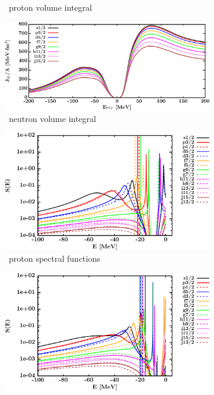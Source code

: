 \begin{figure}[hbtp]
\begin{subfigure}[b]{0.45\textwidth}
        \caption{\snFour\ proton volume integral}
        \label{DOMFitData_sn124_proton_potentialIntegral}
    \end{subfigure}\hspace{6pt}
    \begin{subfigure}[b]{0.45\textwidth}
        \centering
        \includegraphics[width=\linewidth]{figures/sn124_neutronVolumeIntegrals.png}
        \caption{\snFour\ neutron volume integral}
        \label{DOMFitData_sn124_neutron_potentialIntegral}
    \end{subfigure}\vspace{0.3in}
    \begin{subfigure}[b]{0.45\textwidth}
        \centering
        \includegraphics[width=\linewidth]{figures/sn124_protonSpectralFunctions.png}
        \caption{\snFour\ proton spectral functions}
        \label{DOMFitData_sn124_proton_spectralFunctions}
    \end{subfigure}\hspace{6pt}
    \begin{subfigure}[b]{0.45\textwidth}
        \centering
        \includegraphics[width=\linewidth]{figures/sn124_neutronSpectralFunctions.png}

\end{subfigure}
\end{figure}

